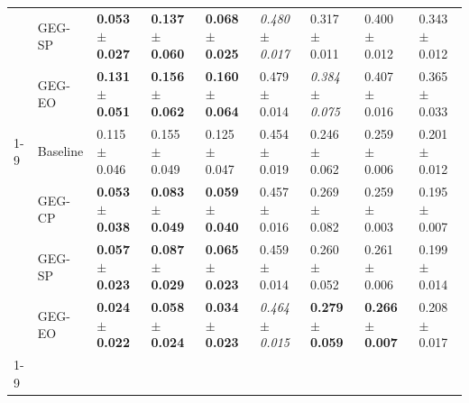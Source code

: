 \begin{table}
\begin{tabular}{lllllllll}
 & GEG-SP & \textbf{0.053 $\pm$ 0.027} & \textbf{0.137 $\pm$ 0.060} & \textbf{0.068 $\pm$ 0.025} & \textit{0.480 $\pm$ 0.017} & 0.317 $\pm$ 0.011 & 0.400 $\pm$ 0.012 & 0.343 $\pm$ 0.012 \\
 & GEG-EO & \textbf{0.131 $\pm$ 0.051} & \textbf{0.156 $\pm$ 0.062} & \textbf{0.160 $\pm$ 0.064} & 0.479 $\pm$ 0.014 & \textit{0.384 $\pm$ 0.075} & 0.407 $\pm$ 0.016 & 0.365 $\pm$ 0.033 \\
\cline{1-9}
\multirow[t]{4}{*}{wine} & Baseline & 0.115 $\pm$ 0.046 & 0.155 $\pm$ 0.049 & 0.125 $\pm$ 0.047 & 0.454 $\pm$ 0.019 & 0.246 $\pm$ 0.062 & 0.259 $\pm$ 0.006 & 0.201 $\pm$ 0.012 \\
 & GEG-CP & \textbf{0.053 $\pm$ 0.038} & \textbf{0.083 $\pm$ 0.049} & \textbf{0.059 $\pm$ 0.040} & 0.457 $\pm$ 0.016 & 0.269 $\pm$ 0.082 & 0.259 $\pm$ 0.003 & 0.195 $\pm$ 0.007 \\
 & GEG-SP & \textbf{0.057 $\pm$ 0.023} & \textbf{0.087 $\pm$ 0.029} & \textbf{0.065 $\pm$ 0.023} & 0.459 $\pm$ 0.014 & 0.260 $\pm$ 0.052 & 0.261 $\pm$ 0.006 & 0.199 $\pm$ 0.014 \\
 & GEG-EO & \textbf{0.024 $\pm$ 0.022} & \textbf{0.058 $\pm$ 0.024} & \textbf{0.034 $\pm$ 0.023} & \textit{0.464 $\pm$ 0.015} & \textbf{0.279 $\pm$ 0.059} & \textbf{0.266 $\pm$ 0.007} & 0.208 $\pm$ 0.017 \\
\cline{1-9}
\bottomrule
\end{tabular}
\end{table}

